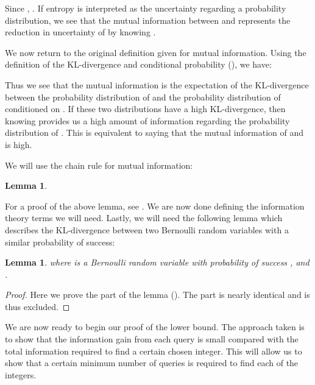 \documentclass[12pt]{article}
\newtheorem{lemma}[theorem]{Lemma}
\begin{document}
Since , . If entropy is interpreted as the uncertainty regarding a probability distribution, we see that the mutual information between  and  represents the reduction in uncertainty of  by knowing . 

We now return to the original definition given for mutual information. Using the definition of the KL-divergence and conditional probability (), we have: 

Thus we see that the mutual information  is the expectation of the KL-divergence between the probability distribution of  and the probability distribution of  conditioned on . If these two distributions have a high KL-divergence, then knowing  provides us a high amount of information regarding the probability distribution of . This is equivalent to saying that the mutual information of  and  is high.

We will use the chain rule for mutual information: 
\begin{lemma} \label{lem:mutinfochain}

\end{lemma}

For a proof of the above lemma, see \cite{Cover}. We are now done defining the information theory terms we will need. Lastly, we will need the following lemma which describes the KL-divergence between two Bernoulli random variables with a similar probability of success:
\begin{lemma} \label{lem:berndiv}
 where  is a Bernoulli random variable with probability of success ,  and .
\end{lemma}

\begin{proof}
Here we prove the  part of the lemma (). The  part is nearly identical and is thus excluded.
 
\end{proof} 

We are now ready to begin our proof of the lower bound. The approach taken is to show that the information gain from each query is small compared with the total information required to find a certain chosen integer. This will allow us to show that a certain minimum number of queries is required to find each of the  integers.
\end{document}
